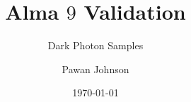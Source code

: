 \documentclass{beamer}
\title{Alma $9$ Validation}
\subtitle{Dark Photon Samples}
\author{Pawan Johnson}
\institute{University of Liverpool}
\date{\today}
\begin{document}
\begingroup
{}
\begin{frame}
    \maketitle
\end{frame}
\endgroup







\appendix
\appendsubframes
\end{document}
